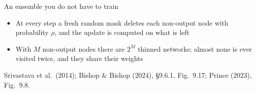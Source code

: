 \documentclass[aspectratio=169, 11pt]{beamer}
\newcommand{\srcline}[1]{%
  \par\vspace{0.25em}%
  {\scriptsize\color{mcMuted}\hfill #1\par}}
\begin{document}
\begin{frame}{An ensemble you do not have to train}
\begin{center}
  \end{center}
  \vspace{-0.15em}
  \begin{itemize}\itemsep0.24em
    \item At every step a fresh random mask deletes each non-output node
          with probability $\rho$, and the update is computed on what is
          left
    \item With $M$ non-output nodes there are $2^{M}$ thinned networks;
          almost none is ever visited twice, and they \alert{share} their
          weights
  \end{itemize}
  \srcline{Srivastava et al.\ (2014); Bishop \& Bishop (2024), \S9.6.1,
  Fig.~9.17; Prince (2023), Fig.~9.8.}
\end{frame}
\end{document}
